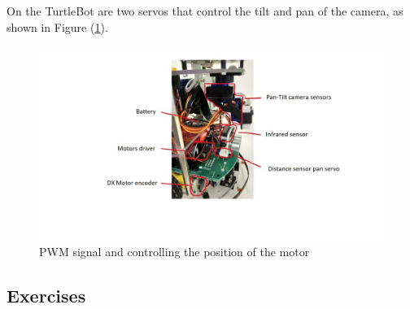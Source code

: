 \documentclass[english]{article}
\begin{document}
\newpage
On the TurtleBot are two servos that control the tilt and pan of the camera,
as shown in Figure (\ref{fig:motor}).
\begin{figure}[!h]
    \centering
    \includegraphics[width=1.10\textwidth, height=0.35\textheight]{figures/motor.png}
    \caption{PWM signal and controlling the position of the motor}
    \label{fig:motor}
\end{figure}
\subsection{Exercises}
\end{document}
